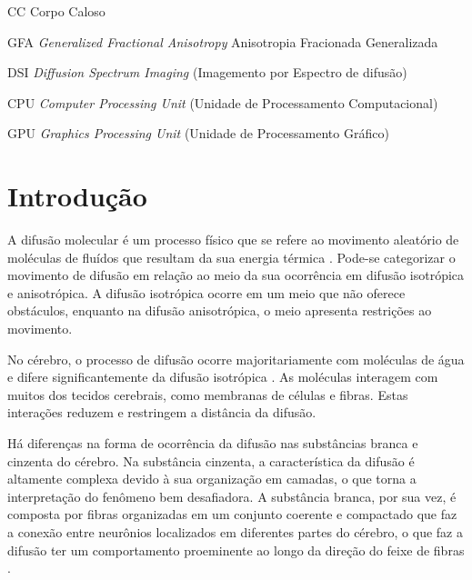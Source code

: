 \documentclass[
    12pt,                %
    oneside,            %
    a4paper,            %
    english,            %
    french,                %
    spanish,            %
    brazil                %
    ]{abntex2}
\begin{document}
\begin{siglas}
\item[CC] Corpo Caloso

\item[GFA] \textit{Generalized Fractional Anisotropy} Anisotropia Fracionada Generalizada

\item[DSI] \textit{Diffusion Spectrum Imaging} (Imagemento por Espectro de difusão)

\item [CPU] \textit{Computer Processing Unit} (Unidade de Processamento Computacional)

\item [GPU] \textit{Graphics Processing Unit} (Unidade de Processamento Gráfico)
\end{siglas}





\tableofcontents*
\cleardoublepage



\textual



\chapter{Introdução}
\label{sec:introducao}

A difusão molecular é um processo físico que se refere ao movimento aleatório de moléculas de fluídos que resultam da sua energia térmica \cite{lebihan2006}. 
Pode-se categorizar o movimento de difusão em relação ao meio da sua ocorrência em difusão isotrópica e anisotrópica. A difusão isotrópica ocorre em um meio que não oferece obstáculos, enquanto na difusão anisotrópica, o meio apresenta restrições ao movimento.

No cérebro, o processo de difusão ocorre majoritariamente com moléculas de água e difere significantemente da difusão isotrópica \cite{lebihan2006}. As moléculas interagem com muitos dos tecidos cerebrais, como membranas de células e fibras. Estas interações reduzem e restringem a distância da difusão.


Há diferenças na forma de ocorrência da difusão nas substâncias branca e cinzenta do cérebro. Na substância cinzenta, a característica da difusão é altamente complexa devido à sua organização em camadas, o que torna a interpretação do fenômeno bem desafiadora. A substância branca, por sua vez, é composta por fibras organizadas em um conjunto coerente e compactado que faz a conexão entre neurônios localizados em diferentes partes do cérebro, o que faz a difusão ter um comportamento proeminente ao longo da direção do feixe de fibras \cite{DTI_Handbook}.
\end{document}
